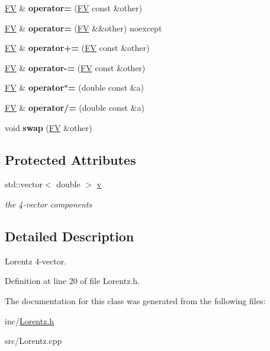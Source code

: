 \begin{DoxyCompactItemize}
\item 
\hypertarget{classFV_aa7bad77e8a25ff4d3d769a544eccf314}{}\hyperlink{classFV}{F\+V} \& {\bfseries operator=} (\hyperlink{classFV}{F\+V} const \&other)\label{classFV_aa7bad77e8a25ff4d3d769a544eccf314}

\item 
\hypertarget{classFV_ac95050de7df77088ad31b1c755e2fe33}{}\hyperlink{classFV}{F\+V} \& {\bfseries operator=} (\hyperlink{classFV}{F\+V} \&\&other) noexcept\label{classFV_ac95050de7df77088ad31b1c755e2fe33}

\item 
\hypertarget{classFV_ac30a0c8c757d2e5dbd74131f569f48db}{}\hyperlink{classFV}{F\+V} \& {\bfseries operator+=} (\hyperlink{classFV}{F\+V} const \&other)\label{classFV_ac30a0c8c757d2e5dbd74131f569f48db}

\item 
\hypertarget{classFV_a32a55d4f37e616b0b043282a201aa0f6}{}\hyperlink{classFV}{F\+V} \& {\bfseries operator-\/=} (\hyperlink{classFV}{F\+V} const \&other)\label{classFV_a32a55d4f37e616b0b043282a201aa0f6}

\item 
\hypertarget{classFV_ac50969de8023081218ac2480f4403a4d}{}\hyperlink{classFV}{F\+V} \& {\bfseries operator$\ast$=} (double const \&a)\label{classFV_ac50969de8023081218ac2480f4403a4d}

\item 
\hypertarget{classFV_a8d74f60b130edb26fd62c590ea5ecfce}{}\hyperlink{classFV}{F\+V} \& {\bfseries operator/=} (double const \&a)\label{classFV_a8d74f60b130edb26fd62c590ea5ecfce}

\item 
\hypertarget{classFV_a4e403b1c96be31cc1572c399a61d5933}{}void {\bfseries swap} (\hyperlink{classFV}{F\+V} \&other)\label{classFV_a4e403b1c96be31cc1572c399a61d5933}

\end{DoxyCompactItemize}
\subsection*{Protected Attributes}
\begin{DoxyCompactItemize}
\item 
\hypertarget{classFV_a3bd5ca0ce4ba350f0c2a177f196419df}{}std\+::vector$<$ double $>$ \hyperlink{classFV_a3bd5ca0ce4ba350f0c2a177f196419df}{v}\label{classFV_a3bd5ca0ce4ba350f0c2a177f196419df}

\begin{DoxyCompactList}\small\item\em the 4-\/vector components \end{DoxyCompactList}\end{DoxyCompactItemize}


\subsection{Detailed Description}
Lorentz 4-\/vector. 

Definition at line 20 of file Lorentz.\+h.



The documentation for this class was generated from the following files\+:\begin{DoxyCompactItemize}
\item 
inc/\hyperlink{Lorentz_8h}{Lorentz.\+h}\item 
src/Lorentz.\+cpp\end{DoxyCompactItemize}
